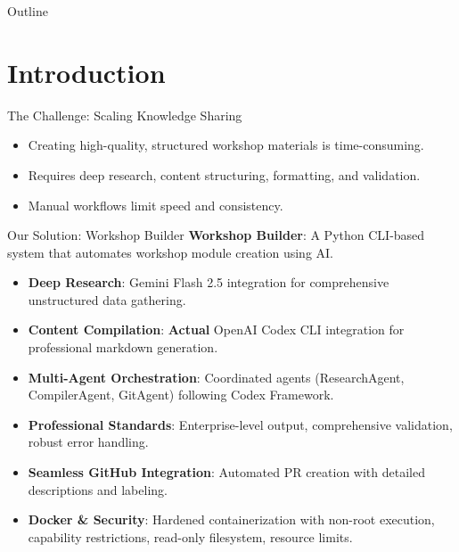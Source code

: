 \documentclass{beamer}
\title\[Workshop Builder]{Workshop Builder: OpenAI Codex Framework-Powered Curriculum Generation}
\author{The Workshop Builder Team}
\institute{DREAMLAB - AI}
\date{\today}
\begin{document}
\begin{frame}
\titlepage
\end{frame}

\begin{frame}{Outline}
\tableofcontents
\end{frame}

\section{Introduction}

\begin{frame}{The Challenge: Scaling Knowledge Sharing}
\begin{itemize}
\item Creating high-quality, structured workshop materials is time-consuming.
\item Requires deep research, content structuring, formatting, and validation.
\item Manual workflows limit speed and consistency.
\end{itemize}
\end{frame}

\begin{frame}{Our Solution: Workshop Builder}
\textbf{Workshop Builder}: A Python CLI-based system that automates workshop module creation using AI.
\begin{itemize}
\item \textbf{Deep Research}: Gemini Flash 2.5 integration for comprehensive unstructured data gathering.
\item \textbf{Content Compilation}: \textbf{Actual} OpenAI Codex CLI integration for professional markdown generation.
\item \textbf{Multi-Agent Orchestration}: Coordinated agents (ResearchAgent, CompilerAgent, GitAgent) following Codex Framework.
\item \textbf{Professional Standards}: Enterprise-level output, comprehensive validation, robust error handling.
\item \textbf{Seamless GitHub Integration}: Automated PR creation with detailed descriptions and labeling.
\item \textbf{Docker & Security}: Hardened containerization with non-root execution, capability restrictions, read-only filesystem, resource limits.
\end{itemize}
\end{frame}
\end{document}
